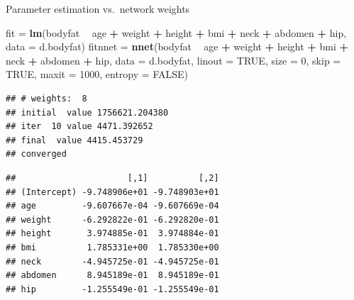 \documentclass[10pt,ignorenonframetext,]{beamer}
\newenvironment{Shaded}{\begin{snugshade}}{\end{snugshade}}
\newcommand{\KeywordTok}[1]{\textcolor[rgb]{0.13,0.29,0.53}{\textbf{#1}}}
\newcommand{\DataTypeTok}[1]{\textcolor[rgb]{0.13,0.29,0.53}{#1}}
\newcommand{\DecValTok}[1]{\textcolor[rgb]{0.00,0.00,0.81}{#1}}
\newcommand{\StringTok}[1]{\textcolor[rgb]{0.31,0.60,0.02}{#1}}
\newcommand{\OtherTok}[1]{\textcolor[rgb]{0.56,0.35,0.01}{#1}}
\newcommand{\OperatorTok}[1]{\textcolor[rgb]{0.81,0.36,0.00}{\textbf{#1}}}
\newcommand{\NormalTok}[1]{#1}
\begin{document}
\begin{frame}[fragile]

\begin{block}{Parameter estimation vs.~network weights}

\scriptsize

\begin{Shaded}
\begin{Highlighting}[]
\NormalTok{fit =}\StringTok{ }\KeywordTok{lm}\NormalTok{(bodyfat }\OperatorTok{~}\StringTok{ }\NormalTok{age }\OperatorTok{+}\StringTok{ }\NormalTok{weight }\OperatorTok{+}\StringTok{ }\NormalTok{height }\OperatorTok{+}\StringTok{ }\NormalTok{bmi }\OperatorTok{+}\StringTok{ }\NormalTok{neck }\OperatorTok{+}\StringTok{ }\NormalTok{abdomen }\OperatorTok{+}\StringTok{ }
\StringTok{    }\NormalTok{hip, }\DataTypeTok{data =}\NormalTok{ d.bodyfat)}
\NormalTok{fitnnet =}\StringTok{ }\KeywordTok{nnet}\NormalTok{(bodyfat }\OperatorTok{~}\StringTok{ }\NormalTok{age }\OperatorTok{+}\StringTok{ }\NormalTok{weight }\OperatorTok{+}\StringTok{ }\NormalTok{height }\OperatorTok{+}\StringTok{ }\NormalTok{bmi }\OperatorTok{+}\StringTok{ }\NormalTok{neck }\OperatorTok{+}\StringTok{ }\NormalTok{abdomen }\OperatorTok{+}\StringTok{ }
\StringTok{    }\NormalTok{hip, }\DataTypeTok{data =}\NormalTok{ d.bodyfat, }\DataTypeTok{linout =} \OtherTok{TRUE}\NormalTok{, }\DataTypeTok{size =} \DecValTok{0}\NormalTok{, }\DataTypeTok{skip =} \OtherTok{TRUE}\NormalTok{, }\DataTypeTok{maxit =} \DecValTok{1000}\NormalTok{, }
    \DataTypeTok{entropy =} \OtherTok{FALSE}\NormalTok{)}
\end{Highlighting}
\end{Shaded}

\begin{verbatim}
## # weights:  8
## initial  value 1756621.204380 
## iter  10 value 4471.392652
## final  value 4415.453729 
## converged
\end{verbatim}

\begin{Shaded}
\end{Shaded}

\begin{verbatim}
##                      [,1]          [,2]
## (Intercept) -9.748906e+01 -9.748903e+01
## age         -9.607667e-04 -9.607669e-04
## weight      -6.292822e-01 -6.292820e-01
## height       3.974885e-01  3.974884e-01
## bmi          1.785331e+00  1.785330e+00
## neck        -4.945725e-01 -4.945725e-01
## abdomen      8.945189e-01  8.945189e-01
## hip         -1.255549e-01 -1.255549e-01
\end{verbatim}

\end{block}

\end{frame}
\end{document}

